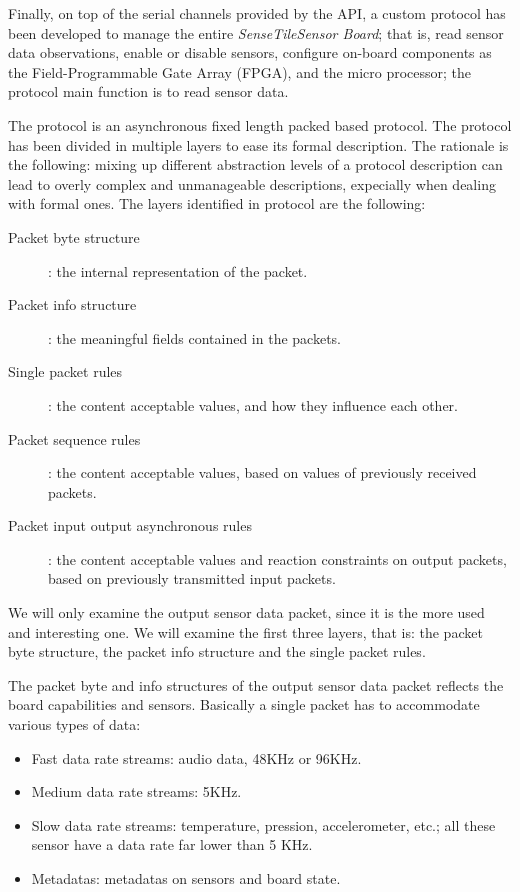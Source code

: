 \documentclass{article}
\newcommand{\ST}{\emph{SenseTile}\xspace}
\newcommand{\STSB}{\ST \emph{Sensor Board}\xspace}
\begin{document}
Finally, on top of the serial channels provided by the API, a custom protocol 
has been developed to manage the entire \STSB; that is, read sensor data 
observations, enable or disable sensors, configure on-board components 
as the Field-Programmable Gate Array (FPGA), and the micro processor; the 
protocol main function is to read sensor data.

The protocol is an asynchronous fixed length packed based protocol.
The protocol has been divided in multiple layers to ease its formal description.
The rationale is the following: mixing up different abstraction levels of a 
protocol description can lead to overly complex and unmanageable descriptions, 
expecially when dealing with formal ones.
The layers identified in protocol are the following:

\begin{description}
 \item[Packet byte structure]: the internal representation of the packet.
 \item[Packet info structure]: the meaningful fields contained in the packets.
 \item[Single packet rules]: the content acceptable values, and how they 
influence each other.
 \item[Packet sequence rules]: the content acceptable values, based on values 
of previously received packets.
 \item[Packet input output asynchronous rules]: the content acceptable values 
and reaction constraints on output packets, based on previously transmitted 
input packets.
\end{description}

We will only examine the output sensor data packet, since it is the more used 
and interesting one.
We will examine the first three layers, that is: the packet byte structure, the 
packet info structure and the single packet rules.

The packet byte and info structures of the output sensor data packet reflects the board 
capabilities and sensors.
Basically a single packet has to accommodate various types of data:
\begin{itemize}
 \item Fast data rate streams: audio data, 48KHz or 96KHz.
 \item Medium data rate streams: 5KHz.
 \item Slow data rate streams: temperature, pression, accelerometer, etc.; all 
 these sensor have a data rate far lower than 5 KHz.
 \item Metadatas: metadatas on sensors and board state.
\end{itemize}
\end{document}
